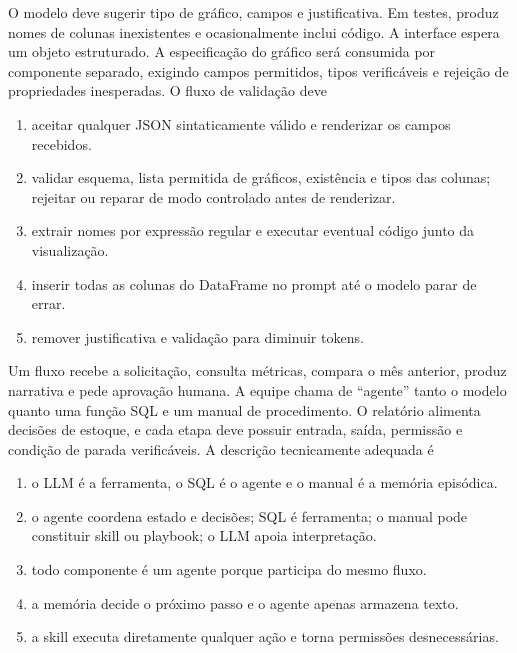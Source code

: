 \TextoBase
O modelo deve sugerir tipo de gráfico, campos e justificativa. Em testes, produz nomes de colunas inexistentes e ocasionalmente inclui código. A interface espera um objeto estruturado.
A especificação do gráfico será consumida por componente separado, exigindo campos permitidos, tipos verificáveis e rejeição de propriedades inesperadas.
\FonteDidatica
\Comando O fluxo de validação deve
\begin{enumerate}[label=\Alph*)]
\item aceitar qualquer JSON sintaticamente válido e renderizar os campos recebidos.
\item validar esquema, lista permitida de gráficos, existência e tipos das colunas; rejeitar ou reparar de modo controlado antes de renderizar.
\item extrair nomes por expressão regular e executar eventual código junto da visualização.
\item inserir todas as colunas do DataFrame no prompt até o modelo parar de errar.
\item remover justificativa e validação para diminuir tokens.
\end{enumerate}

\TextoBase
Um fluxo recebe a solicitação, consulta métricas, compara o mês anterior, produz narrativa e pede aprovação humana. A equipe chama de ``agente'' tanto o modelo quanto uma função SQL e um manual de procedimento.
O relatório alimenta decisões de estoque, e cada etapa deve possuir entrada, saída, permissão e condição de parada verificáveis.
\FonteDidatica
\Comando A descrição tecnicamente adequada é
\begin{enumerate}[label=\Alph*)]
\item o LLM é a ferramenta, o SQL é o agente e o manual é a memória episódica.
\item o agente coordena estado e decisões; SQL é ferramenta; o manual pode constituir skill ou playbook; o LLM apoia interpretação.
\item todo componente é um agente porque participa do mesmo fluxo.
\item a memória decide o próximo passo e o agente apenas armazena texto.
\item a skill executa diretamente qualquer ação e torna permissões desnecessárias.
\end{enumerate}

